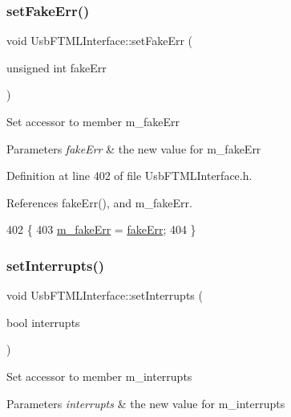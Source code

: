 \subsubsection{\texorpdfstring{set\+Fake\+Err()}{setFakeErr()}}
{\footnotesize\ttfamily void Usb\+F\+T\+M\+L\+Interface\+::set\+Fake\+Err (\begin{DoxyParamCaption}\item[{unsigned int}]{fake\+Err }\end{DoxyParamCaption})\hspace{0.3cm}{\ttfamily [inline]}}

Set accessor to member m\+\_\+fake\+Err 
\begin{DoxyParams}{Parameters}
{\em fake\+Err} & the new value for m\+\_\+fake\+Err \\
\hline
\end{DoxyParams}


Definition at line 402 of file Usb\+F\+T\+M\+L\+Interface.\+h.



References fake\+Err(), and m\+\_\+fake\+Err.


\begin{DoxyCode}
402                                          \{
403     \hyperlink{classUsbFTMLInterface_a35c84586c9aae7555b56481d636338e8}{m\_fakeErr} = \hyperlink{classUsbFTMLInterface_a0379dd75800521cea37580d68205f620}{fakeErr};
404   \}
\end{DoxyCode}
\mbox{\label{classUsbFTMLInterface_ac82eb9d63d4279998765dcc8c539bba9}} 
\subsubsection{\texorpdfstring{set\+Interrupts()}{setInterrupts()}}
{\footnotesize\ttfamily void Usb\+F\+T\+M\+L\+Interface\+::set\+Interrupts (\begin{DoxyParamCaption}\item[{bool}]{interrupts }\end{DoxyParamCaption})\hspace{0.3cm}{\ttfamily [inline]}}

Set accessor to member m\+\_\+interrupts 
\begin{DoxyParams}{Parameters}
{\em interrupts} & the new value for m\+\_\+interrupts \\
\hline
\end{DoxyParams}


